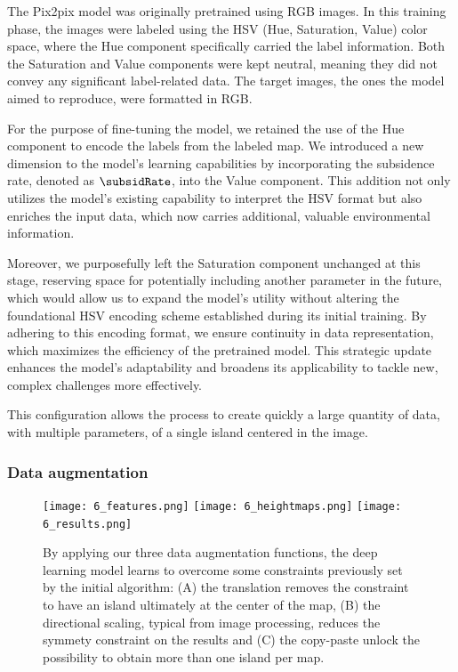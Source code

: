 The Pix2pix model was originally pretrained using RGB images. In this training phase, the images were labeled using the HSV (Hue, Saturation, Value) color space, where the Hue component specifically carried the label information. Both the Saturation and Value components were kept neutral, meaning they did not convey any significant label-related data. The target images, the ones the model aimed to reproduce, were formatted in RGB.

For the purpose of fine-tuning the model, we retained the use of the Hue component to encode the labels from the labeled map. We introduced a new dimension to the model's learning capabilities by incorporating the subsidence rate, denoted as $\subsidRate$, into the Value component. This addition not only utilizes the model's existing capability to interpret the HSV format but also enriches the input data, which now carries additional, valuable environmental information.

Moreover, we purposefully left the Saturation component unchanged at this stage, reserving space for potentially including another parameter in the future, which would allow us to expand the model's utility without altering the foundational HSV encoding scheme established during its initial training. By adhering to this encoding format, we ensure continuity in data representation, which maximizes the efficiency of the pretrained model. This strategic update enhances the model's adaptability and broadens its applicability to tackle new, complex challenges more effectively.

This configuration allows the process to create quickly a large quantity of data, with multiple parameters, of a single island centered in the image. 

\subsubsection{Data augmentation}
\begin{figure}
    \texttt{[image: 6\_features.png]}
    \texttt{[image: 6\_heightmaps.png]}
    \texttt{[image: 6\_results.png]}
    \caption{By applying our three data augmentation functions, the deep learning model learns to overcome some constraints previously set by the initial algorithm: (A) the translation removes the constraint to have an island ultimately at the center of the map, (B) the directional scaling, typical from image processing, reduces the symmety constraint on the results and (C) the copy-paste unlock the possibility to obtain more than one island per map.}
    \label{fig:coral-island_data-augmentation-examples}
\end{figure}

